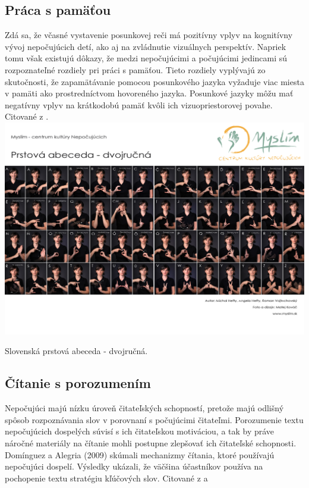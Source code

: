 \documentclass[10pt,twoside,slovak,a4paper]{article}
\begin{document}
\subsection{Práca s pamäťou} \label{rozdiely:pamat}
Zdá sa, že včasné vystavenie posunkovej reči má pozitívny vplyv na kognitívny vývoj nepočujúcich detí, ako aj na zvládnutie vizuálnych perspektív. Napriek tomu však existujú dôkazy, že medzi nepočujúcimi a počujúcimi jedincami sú rozpoznateľné rozdiely pri práci s pamäťou. Tieto rozdiely vyplývajú zo skutočnosti, že zapamätávanie pomocou posunkového jazyka vyžaduje viac miesta v pamäti ako prostredníctvom hovoreného jazyka. Posunkové jazyky môžu mať negatívny vplyv na krátkodobú pamäť kvôli ich vizuopriestorovej povahe. 
Citované z \cite{pappas2018learning}.
\includegraphics[scale=0.1]{dvojrucna-tlac.jpg}
\caption{Slovenská prstová abeceda - dvojručná.}
\cite{mytyafakty}


\subsection{Čítanie s porozumením} \label{rozdiely:citanie}
Nepočujúci majú nízku úroveň čitateľských schopností, pretože majú odlišný spôsob rozpoznávania slov v porovnaní s počujúcimi čitateľmi. Porozumenie textu nepočujúcich dospelých súvisí s ich čitateľskou motiváciou, a tak by práve náročné materiály na čítanie mohli postupne zlepšovať ich čitateľské schopnosti. Domínguez a Alegria (2009) skúmali mechanizmy čítania, ktoré používajú nepočujúci dospelí. Výsledky ukázali, že väčšina účastníkov používa na pochopenie textu stratégiu kľúčových slov. 
 Citované z \cite{pappas2018learning} a \cite{dominguez2010reading}
\end{document}
